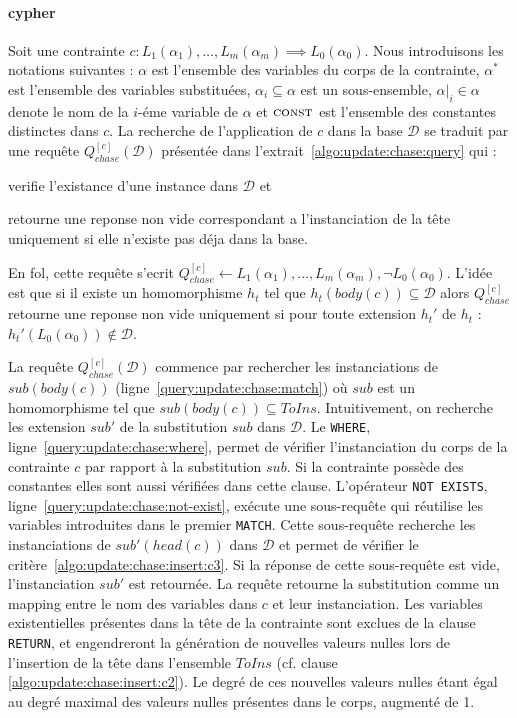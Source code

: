 \paragraph{\gls{cypher}}
Soit une contrainte $c : L_1(\alpha_1), \dots, L_m(\alpha_m) \implies L_0(\alpha_0)$.
Nous introduisons les notations suivantes : $\alpha$ est l'ensemble des variables du corps de la contrainte, $\alpha^*$ est l'ensemble des variables substituées, $\alpha_i \subseteq \alpha$ est un sous-ensemble, $\alpha|_i \in \alpha$ denote le nom de la $i$-éme variable de $\alpha$ et $\textsc{const}$ est l'ensemble des constantes distinctes dans $c$.
La recherche de l'application de $c$ dans la base $\mathcal{D}$ se traduit par une requête $Q_{chase}^{[c]}(\mathcal{D})$ présentée dans l'extrait~\ref{algo:update:chase:query} qui :
\begin{enumerate*}[label=(\roman*)]
    \item verifie l'existance d'une instance dans $\mathcal{D}$ et
    \item retourne une reponse non vide correspondant a l'instanciation de la tête uniquement si elle n'existe pas déja dans la base.
\end{enumerate*}
En \gls{fol}, cette requête s'ecrit $Q_{chase}^{[c]} \gets L_1(\alpha_1), \dots, L_m(\alpha_m), \lnot L_0(\alpha_0)$.
L'idée est que si il existe un homomorphisme $h_t$ tel que $h_t(body(c)) \subseteq \mathcal{D}$ alors $Q_{chase}^{[c]}$ retourne une reponse non vide uniquement si pour toute extension $h_t'$ de $h_t$ : $h_t'(L_0(\alpha_0)) \notin \mathcal{D}$.

La requête $Q_{chase}^{[c]}(\mathcal{D})$ commence par rechercher les instanciations de $sub(body(c))$ (ligne~\ref{query:update:chase:match}) où $sub$ est un homomorphisme tel que $sub(body(c)) \subseteq ToIns$.
Intuitivement, on recherche les extension $sub'$ de la substitution $sub$ dans $\mathcal{D}$.
Le \verb|WHERE|, ligne~\ref{query:update:chase:where}, permet de vérifier l'instanciation du corps de la contrainte $c$ par rapport à la substitution $sub$.
Si la contrainte possède des constantes elles sont aussi vérifiées dans cette clause.
L'opérateur \verb|NOT EXISTS|, ligne~\ref{query:update:chase:not-exist}, exécute une sous-requête qui réutilise les variables introduites dans le premier \verb|MATCH|.
Cette sous-requête recherche les instanciations de $sub'(head(c))$ dans $\mathcal{D}$ et permet de vérifier le critère~\ref{algo:update:chase:insert:c3}.
Si la réponse de cette sous-requête est vide, l'instanciation $sub'$ est retournée.
La requête retourne la substitution comme un mapping entre le nom des variables dans $c$ et leur instanciation.
Les variables existentielles présentes dans la tête de la contrainte sont exclues de la clause \verb|RETURN|, et  engendreront la génération de nouvelles valeurs nulles lors de l'insertion de la tête dans l'ensemble $ToIns$ (cf. clause \ref{algo:update:chase:insert:c2}).
Le degré de ces nouvelles valeurs nulles étant égal au degré maximal des valeurs nulles présentes dans le corps, augmenté de 1.

